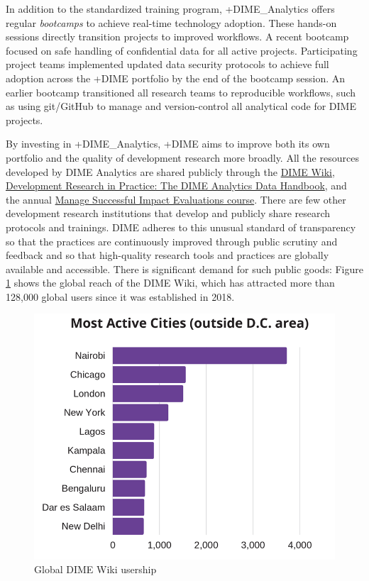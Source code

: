 \documentclass[
]{WileySix}
\begin{document}
In addition to the standardized training program, +DIME\_Analytics\textbar{} offers regular \emph{bootcamps} to achieve real-time technology adoption. These hands-on sessions directly transition projects to improved workflows. A recent bootcamp focused on safe handling of confidential data for all active projects. Participating project teams implemented updated data security protocols to achieve full adoption across the +DIME\textbar{} portfolio by the end of the bootcamp session. An earlier bootcamp transitioned all research teams to reproducible workflows, such as using git/GitHub to manage and version-control all analytical code for DIME projects.

By investing in +DIME\_Analytics\textbar, +DIME\textbar{} aims to improve both its own portfolio and the quality of development research more broadly. All the resources developed by DIME Analytics are shared publicly through the \href{https://dimewiki.worldbank.org/}{DIME Wiki}, \href{https://worldbank.github.io/dime-data-handbook/}{Development Research in Practice: The DIME Analytics Data Handbook}, and the annual \href{https://www.worldbank.org/en/events/2019/06/10/manage-successful-impact-evaluations}{Manage Successful Impact Evaluations course}. There are few other development research institutions that develop and publicly share research protocols and trainings. DIME adheres to this unusual standard of transparency so that the practices are continuously improved through public scrutiny and feedback and so that high-quality research tools and practices are globally available and accessible. There is significant demand for such public goods: Figure \ref{fig:dimefigure4} shows the global reach of the DIME Wiki, which has attracted more than 128,000 global users since it was established in 2018.

\begin{figure}
\includegraphics[width=1\linewidth]{./assets/dime/dimefigure4web} \caption{Global DIME Wiki usership}\label{fig:dimefigure4}
\end{figure}
\end{document}
